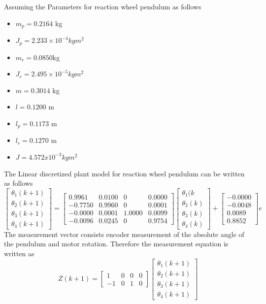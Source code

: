 \documentclass[a4paper]{article}
\begin{document}
Assuming the Parameters for reaction wheel pendulum as follows
\begin{itemize}
\item $m_p = 0.2164$ kg
\item $J_p = 2.233 \times 10^{-4}kgm^2 $ 
\item $m_r = 0.0850$kg
\item $J_r = 2.495 \times 10^{-5}kgm^2$ 
\item $m = 0.3014$ kg
\item $l = 0.1200$ m
\item $l_p = 0.1173$ m
\item $l_r = 0.1270$ m
\item $J = 4.572 x 10^{-3}kgm^2$ 
\end{itemize}
The Linear discretized plant model for reaction wheel pendulum can be written as follows
\begin{equation}
\left[\begin{array}{c}
\theta_1(k+1)\\ 
\theta_2(k+1)\\ 
\theta_3(k+1)\\ 
\theta_4(k+1)
\end{array}\right] = \left[\begin{array}{cccc}
    0.9961 &   0.0100   &      0  &  0.0000\\
    -0.7750  &  0.9960  &       0  &  0.0001\\
    -0.0000  &  0.0001  &  1.0000  &  0.0099\\
    -0.0096  &  0.0245  &       0  &  0.9754
\end{array} \right]\left[\begin{array}{c}
\theta_1(k\\ 
\theta_2(k)\\ 
\theta_3(k)\\ 
\theta_4(k)
\end{array}\right]+\left[\begin{array}{c}
-0.0000\\
-0.0048\\
0.0089\\
0.8852
\end{array} \right]e 
\end{equation}
The measurement vector consists encoder measurement of the absolute angle of the pendulum and motor rotation. Therefore the measurement equation is written as
\begin{equation}
Z(k+1) = \left[\begin{array}{cccc}
 1   &  0   &  0  &   0 \\
 -1  &   0   &  1   &  0
\end{array} \right]\left[\begin{array}{c}
\theta_1(k+1)\\ 
\theta_2(k+1)\\ 
\theta_3(k+1)\\ 
\theta_4(k+1)
\end{array}\right]
\end{equation}
\end{document}
